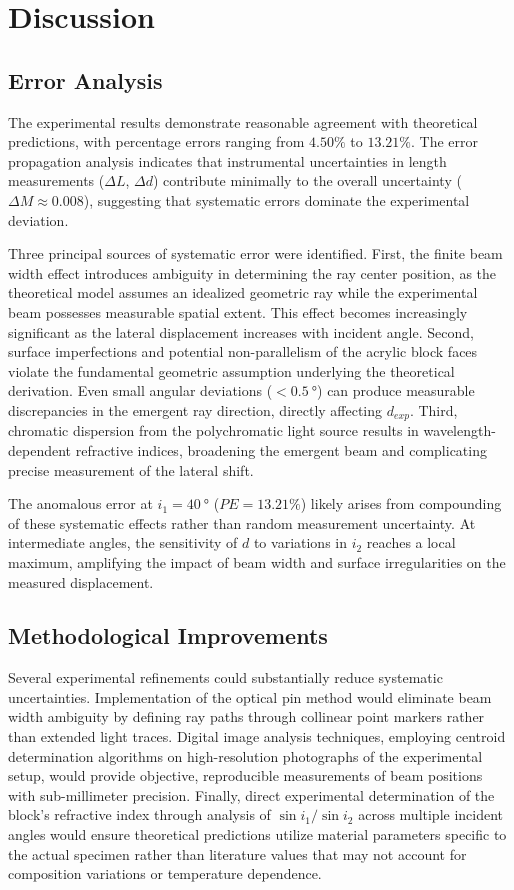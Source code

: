 \documentclass[12pt, a4paper]{article}
\begin{document}
\section{Discussion}

\subsection{Error Analysis}

The experimental results demonstrate reasonable agreement with theoretical predictions, with percentage errors ranging from $4.50\%$ to $13.21\%$. The error propagation analysis indicates that instrumental uncertainties in length measurements ($\Delta L$, $\Delta d$) contribute minimally to the overall uncertainty ($\Delta M \approx 0.008$), suggesting that systematic errors dominate the experimental deviation.

Three principal sources of systematic error were identified. First, the finite beam width effect introduces ambiguity in determining the ray center position, as the theoretical model assumes an idealized geometric ray while the experimental beam possesses measurable spatial extent. This effect becomes increasingly significant as the lateral displacement increases with incident angle. Second, surface imperfections and potential non-parallelism of the acrylic block faces violate the fundamental geometric assumption underlying the theoretical derivation. Even small angular deviations ($<\SI{0.5}{\degree}$) can produce measurable discrepancies in the emergent ray direction, directly affecting $d_{exp}$. Third, chromatic dispersion from the polychromatic light source results in wavelength-dependent refractive indices, broadening the emergent beam and complicating precise measurement of the lateral shift.

The anomalous error at $i_1 = \SI{40}{\degree}$ ($PE = 13.21\%$) likely arises from compounding of these systematic effects rather than random measurement uncertainty. At intermediate angles, the sensitivity of $d$ to variations in $i_2$ reaches a local maximum, amplifying the impact of beam width and surface irregularities on the measured displacement.

\subsection{Methodological Improvements}

Several experimental refinements could substantially reduce systematic uncertainties. Implementation of the optical pin method would eliminate beam width ambiguity by defining ray paths through collinear point markers rather than extended light traces. Digital image analysis techniques, employing centroid determination algorithms on high-resolution photographs of the experimental setup, would provide objective, reproducible measurements of beam positions with sub-millimeter precision. Finally, direct experimental determination of the block's refractive index through analysis of $\sin i_1 / \sin i_2$ across multiple incident angles would ensure theoretical predictions utilize material parameters specific to the actual specimen rather than literature values that may not account for composition variations or temperature dependence.
\end{document}

